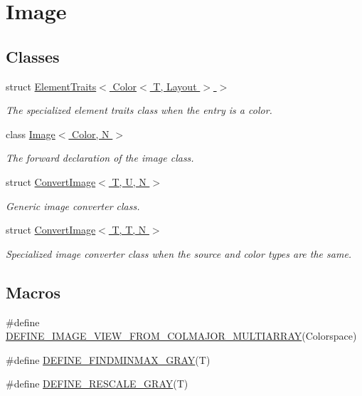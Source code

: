 \hypertarget{group___image}{\section{Image}
\label{group___image}
}
\subsection*{Classes}
\begin{DoxyCompactItemize}
\item 
struct \hyperlink{struct_d_o_1_1_element_traits_3_01_color_3_01_t_00_01_layout_01_4_01_4}{Element\-Traits$<$ Color$<$ T, Layout $>$ $>$}
\begin{DoxyCompactList}\small\item\em The specialized element traits class when the entry is a color. \end{DoxyCompactList}\item 
class \hyperlink{class_d_o_1_1_image}{Image$<$ Color, N $>$}
\begin{DoxyCompactList}\small\item\em The forward declaration of the image class. \end{DoxyCompactList}\item 
struct \hyperlink{struct_d_o_1_1_convert_image}{Convert\-Image$<$ T, U, N $>$}
\begin{DoxyCompactList}\small\item\em Generic image converter class. \end{DoxyCompactList}\item 
struct \hyperlink{struct_d_o_1_1_convert_image_3_01_t_00_01_t_00_01_n_01_4}{Convert\-Image$<$ T, T, N $>$}
\begin{DoxyCompactList}\small\item\em Specialized image converter class when the source and color types are the same. \end{DoxyCompactList}\end{DoxyCompactItemize}
\subsection*{Macros}
\begin{DoxyCompactItemize}
\item 
\#define \hyperlink{group___image_ga3589d93d904fd25e83198258d03d44e6}{D\-E\-F\-I\-N\-E\-\_\-\-I\-M\-A\-G\-E\-\_\-\-V\-I\-E\-W\-\_\-\-F\-R\-O\-M\-\_\-\-C\-O\-L\-M\-A\-J\-O\-R\-\_\-\-M\-U\-L\-T\-I\-A\-R\-R\-A\-Y}(Colorspace)
\item 
\#define \hyperlink{group___image_gab9988e0f3093c7ea96879529b44d3a05}{D\-E\-F\-I\-N\-E\-\_\-\-F\-I\-N\-D\-M\-I\-N\-M\-A\-X\-\_\-\-G\-R\-A\-Y}(T)
\item 
\#define \hyperlink{group___image_gae46f4594b176ee37843b58e67de94b2f}{D\-E\-F\-I\-N\-E\-\_\-\-R\-E\-S\-C\-A\-L\-E\-\_\-\-G\-R\-A\-Y}(T)
\end{DoxyCompactItemize}
